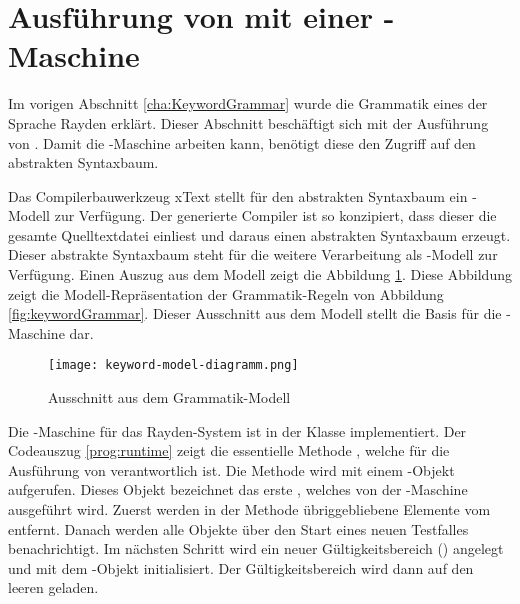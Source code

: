 
\section{Ausführung von  mit einer -Maschine}
\label{cha:StackMachine}

Im vorigen Abschnitt \ref{cha:KeywordGrammar} wurde die Grammatik eines  der Sprache Rayden erklärt. Dieser Abschnitt beschäftigt sich mit der Ausführung von . Damit die -Maschine arbeiten kann, benötigt diese den Zugriff auf den abstrakten Syntaxbaum. 

\SuperPar
Das Compilerbauwerkzeug xText stellt für den abstrakten Syntaxbaum ein -Modell zur Verfügung. Der generierte Compiler ist so konzipiert, dass dieser die gesamte Quelltextdatei einliest und daraus einen abstrakten Syntaxbaum erzeugt. Dieser abstrakte Syntaxbaum steht für die weitere Verarbeitung als -Modell zur Verfügung. Einen Auszug aus dem Modell zeigt die Abbildung \ref{fig:AST}. Diese Abbildung zeigt die Modell-Repräsentation der Grammatik-Regeln von Abbildung \ref{fig:keywordGrammar}. Dieser Ausschnitt aus dem Modell stellt die Basis für die -Maschine dar. 

\begin{figure}[h]
\centering
\texttt{[image: keyword-model-diagramm.png]}
\caption{Ausschnitt aus dem Grammatik-Modell}
\label{fig:AST}
\end{figure}

\SuperPar
Die -Maschine für das Rayden-System ist in der Klasse  implementiert. Der Codeauszug \ref{prog:runtime} zeigt die essentielle Methode , welche für die Ausführung von  verantwortlich ist. Die Methode wird mit einem -Objekt aufgerufen. Dieses Objekt bezeichnet das erste , welches von der -Maschine ausgeführt wird. Zuerst werden in der Methode übriggebliebene Elemente vom  entfernt. Danach werden alle Objekte über den Start eines neuen Testfalles benachrichtigt. Im nächsten Schritt wird ein neuer Gültigkeitsbereich () angelegt und mit dem -Objekt initialisiert. Der Gültigkeitsbereich wird dann auf den leeren  geladen. 

